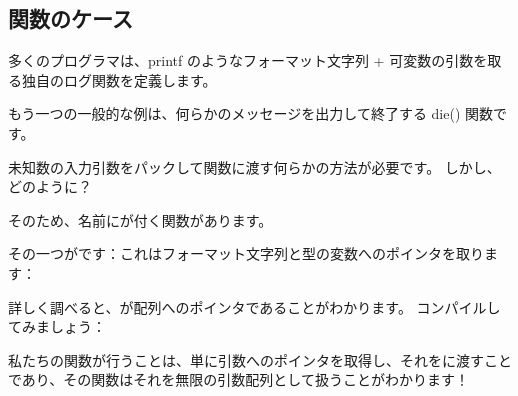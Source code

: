 \subsection{関数のケース}

多くのプログラマは、printf のようなフォーマット文字列 + 可変数の引数を取る独自のログ関数を定義します。

もう一つの一般的な例は、何らかのメッセージを出力して終了する die() 関数です。

未知数の入力引数をパックして\printf 関数に渡す何らかの方法が必要です。
しかし、どのように？

そのため、名前にが付く関数があります。

その一つがです：これはフォーマット文字列と型の変数へのポインタを取ります：



詳しく調べると、が配列へのポインタであることがわかります。
コンパイルしてみましょう：



私たちの関数が行うことは、単に引数へのポインタを取得し、それをに渡すことであり、その関数はそれを無限の引数配列として扱うことがわかります！

